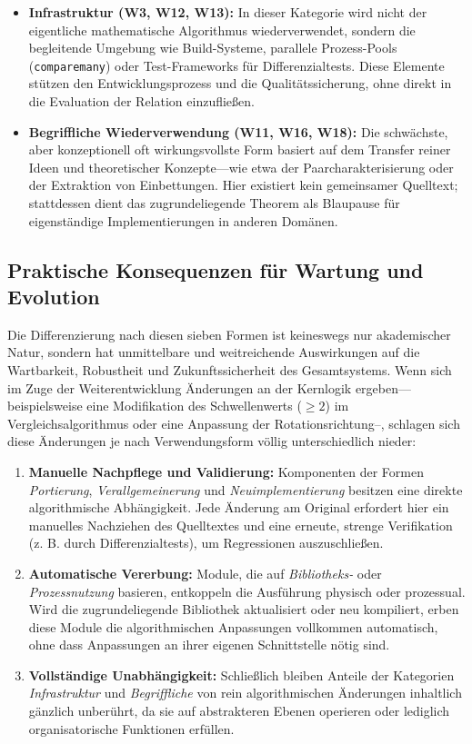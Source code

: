 \documentclass[a4paper,12pt,twoside]{report}
\DeclareRobustCommand{\_}{\textunderscore\allowbreak{}}
\theoremstyle{definition}
\newcommand{\W}[1]{\textbf{W#1}}
\begin{document}
\begin{itemize}
    \item \textbf{Infrastruktur (\W{3}, \W{12}, \W{13}):} In dieser Kategorie wird nicht der eigentliche mathematische Algorithmus wiederverwendet, sondern die begleitende Umgebung wie Build-Systeme, parallele Prozess-Pools (\texttt{compare\_many}) oder Test-Frameworks für Differenzialtests. Diese Elemente stützen den Entwicklungsprozess und die Qualitätssicherung, ohne direkt in die Evaluation der Relation einzufließen.
    
    \item \textbf{Begriffliche Wiederverwendung (\W{11}, \W{16}, \W{18}):} Die schwächste, aber konzeptionell oft wirkungsvollste Form basiert auf dem Transfer reiner Ideen und theoretischer Konzepte—wie etwa der Paarcharakterisierung oder der Extraktion von Einbettungen. Hier existiert kein gemeinsamer Quelltext; stattdessen dient das zugrundeliegende Theorem als Blaupause für eigenständige Implementierungen in anderen Domänen.
\end{itemize}

\subsection*{Praktische Konsequenzen für Wartung und Evolution}

Die Differenzierung nach diesen sieben Formen ist keineswegs nur akademischer Natur, sondern hat unmittelbare und weitreichende Auswirkungen auf die Wartbarkeit, Robustheit und Zukunftssicherheit des Gesamtsystems. Wenn sich im Zuge der Weiterentwicklung Änderungen an der Kernlogik ergeben—beispielsweise eine Modifikation des Schwellenwerts ($\ge 2$) im Vergleichsalgorithmus oder eine Anpassung der Rotationsrichtung--, schlagen sich diese Änderungen je nach Verwendungsform völlig unterschiedlich nieder:

\begin{enumerate}
    \item \textbf{Manuelle Nachpflege und Validierung:} Komponenten der Formen \textit{Portierung}, \textit{Verallgemeinerung} und \textit{Neuimplementierung} besitzen eine direkte algorithmische Abhängigkeit. Jede Änderung am Original erfordert hier ein manuelles Nachziehen des Quelltextes und eine erneute, strenge Verifikation (z. B. durch Differenzialtests), um Regressionen auszuschließen.
    \item \textbf{Automatische Vererbung:} Module, die auf \textit{Bibliotheks-} oder \textit{Prozessnutzung} basieren, entkoppeln die Ausführung physisch oder prozessual. Wird die zugrundeliegende Bibliothek aktualisiert oder neu kompiliert, erben diese Module die algorithmischen Anpassungen vollkommen automatisch, ohne dass Anpassungen an ihrer eigenen Schnittstelle nötig sind.
    \item \textbf{Vollständige Unabhängigkeit:} Schließlich bleiben Anteile der Kategorien \textit{Infrastruktur} und \textit{Begriffliche} von rein algorithmischen Änderungen inhaltlich gänzlich unberührt, da sie auf abstrakteren Ebenen operieren oder lediglich organisatorische Funktionen erfüllen.
\end{enumerate}
\end{document}
